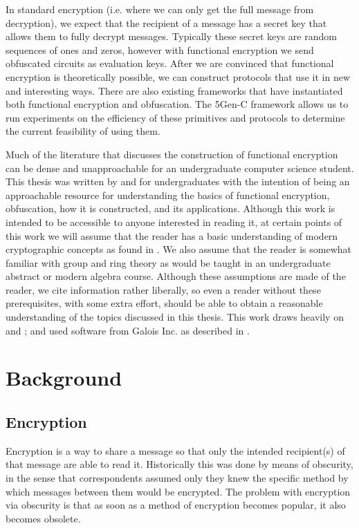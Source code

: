 \documentclass[12pt,twoside]{reedthesis}
\begin{document}
	\par In standard encryption (i.e. where we can only get the full message from decryption), we expect that the recipient of a message has a secret key that allows them to fully decrypt messages. Typically these secret keys are random sequences of ones and zeros, however with functional encryption we send obfuscated circuits as evaluation keys. After we are convinced that functional encryption is theoretically possible, we can construct protocols that use it in new and interesting ways. There are also existing frameworks that have instantiated both functional encryption and obfuscation. The 5Gen-C framework allows us to run experiments on the efficiency of these primitives and protocols to determine the current feasibility of using them.
	\par Much of the literature that discusses the construction of functional encryption can be dense and unapproachable for an undergraduate computer science student. This thesis was written by and for undergraduates with the intention of being an approachable resource for understanding the basics of functional encryption, obfuscation, how it is constructed, and its applications. Although this work is intended to be accessible to anyone interested in reading it, at certain points of this work we will assume that the reader has a basic understanding of modern cryptographic concepts as found in \cite{Katz:2007:IMC:1206501}. We also assume that the reader is somewhat familiar with group and ring theory as would be taught in an undergraduate abstract or modern algebra course. Although these assumptions are made of the reader, we cite information rather liberally, so even a reader without these prerequisites, with some extra effort, should be able to obtain a reasonable understanding of the topics discussed in this thesis. This work draws heavily on \cite{Garg:2013} and \cite{GGH13}; and used software from Galois Inc. as described in \cite{5genc}.
    
   
    

    
    \chapter{Background}
    \section{Encryption}
    Encryption is a way to share a message so that only the intended recipient(s) of
    that message are able to read it. Historically this was done by means of obscurity, in the sense that correspondents assumed only they knew the specific method by which messages between them would be encrypted. The problem with encryption via obscurity is that as soon as a method of encryption becomes popular, it also becomes obsolete.
\end{document}
